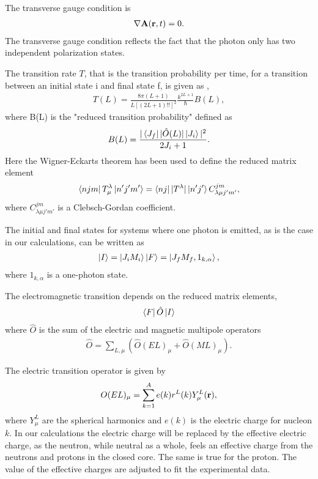 The transverse gauge condition is
\begin{align}
	\nabla \bA(\br,t) = 0.
	\label{Eq:tg}
\end{align}
The transverse gauge condition reflects the fact that the photon only has two
independent polarization states.

The transition rate $T$, that is the transition probability per time, for a
transition between an initial state i and final state f, is given as
\citep{brussaard},
\begin{align}
	T(L) = \frac{8\pi(L+1)}{L[(2L+1)!!]^2}\frac{k^{2L+1}}{\hbar}B(L),
\end{align}
where B(L) is the "reduced transition probability" defined as
\begin{align}
	B(L) = \frac{|\left\langle J_f \right||\hat O(L)|\left| J_i \right\rangle|^2}{2J_i+1}.
\end{align}
Here the Wigner-Eckarts theorem has been used to define the reduced matrix
element
\begin{align}
	\left\langle njm \right|T_\mu^\lambda\left| n'j'm' \right\rangle = \left\langle nj \right||T^\lambda|\left| n'j' \right\rangle C_{\lambda\mu j'm'}^{jm},
\end{align}
where $C_{\lambda\mu j'm'}^{jm}$ is a Clebsch-Gordan coefficient.

The initial and final states for systems where one photon is emitted, as is the
case in our calculations, can be written as
\begin{align}
	\left| I \right\rangle = \left| J_iM_i \right\rangle
\left| F \right\rangle = \left| J_fM_f,1_{k,\alpha} \right\rangle,
\end{align}
where $1_{k,\alpha}$ is a one-photon state.

The electromagnetic transition depends on the reduced matrix elements,
\begin{align}
	\bra F \hat O\ket I
	\label{Eq:Hem}
\end{align}
where $\hat O$ is the sum of the electric and magnetic multipole operators
\begin{align}
	\hat O = \sum_{L,\mu}\left(\hat O(EL)_\mu + \hat O(ML)_\mu\right).
\end{align}

The electric transition operator \citep{brussaard} is given by
\begin{align}
	O(EL)_\mu = \sum_{k=1}^Ae(k)r^L(k)Y_\mu^L(\br),
	\label{Eq:EO}
\end{align}
where $Y_\mu^L$ are the spherical harmonics and $e(k)$ is the electric charge
for nucleon $k$. In our calculations the electric charge will be replaced by
the effective electric charge, as the neutron, while neutral as a whole, feels
an effective charge from the neutrons and protons in the closed core. The same
is true for the proton. The value of the effective charges are adjusted to fit
the experimental data.

